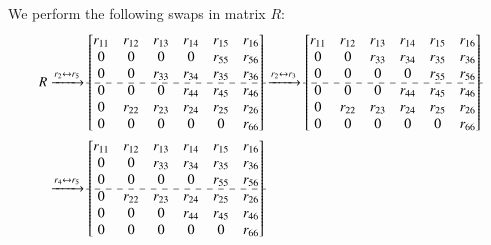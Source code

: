\documentclass[3p]{elsarticle}
\numberwithin{equation}{section}
\begin{document}
We  perform the following swaps in matrix $R$:
\begin{align*}
R
& \xrightarrow{r_{2} \leftrightarrow r_{5}}
\begin{bmatrix}
 r_{11} & r_{12} & r_{13} & r_{14} & r_{15} & r_{16}\\
 0      & 0      & 0      & 0      & r_{55} & r_{56}\\
 0      & 0      & r_{33} & r_{34} & r_{35} & r_{36}\\
 \cdashline{1-6}
 0      & 0      & 0 & r_{44} & r_{45} & r_{46}\\
 0 & r_{22} & r_{23} & r_{24} & r_{25} & r_{26}\\
 0      & 0      & 0      & 0      & 0 & r_{66}\\
\end{bmatrix}
\xrightarrow{r_{2} \leftrightarrow r_{3}}
\begin{bmatrix}
 r_{11} & r_{12} & r_{13} & r_{14} & r_{15} & r_{16}\\
 0      & 0      & r_{33} & r_{34} & r_{35} & r_{36}\\
 0      & 0      & 0      & 0      & r_{55} & r_{56}\\
 \cdashline{1-6}
 0      & 0      & 0 & r_{44} & r_{45} & r_{46}\\
 0 & r_{22} & r_{23} & r_{24} & r_{25} & r_{26}\\
 0      & 0      & 0      & 0      & 0 & r_{66}\\
\end{bmatrix} \\
& \xrightarrow{r_{4} \leftrightarrow r_{5}}
\begin{bmatrix}
 r_{11} & r_{12} & r_{13} & r_{14} & r_{15} & r_{16}\\
 0      & 0      & r_{33} & r_{34} & r_{35} & r_{36}\\
 0      & 0      & 0      & 0      & r_{55} & r_{56}\\
 \cdashline{1-6}
 0 & r_{22} & r_{23} & r_{24} & r_{25} & r_{26}\\
 0      & 0      & 0 & r_{44} & r_{45} & r_{46}\\
 0      & 0      & 0      & 0      & 0 & r_{66}\\

\end{bmatrix}
\end{align*}
\end{document}
